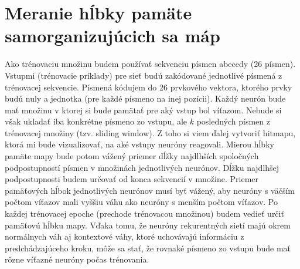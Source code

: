\section{Meranie hĺbky pamäte samorganizujúcich sa máp}
Ako trénovaciu množinu budem používať sekvenciu písmen abecedy (26 písmen).
Vstupmi (trénovacie príklady) pre sieť budú zakódované jednotlivé písmená z trénovacej sekvencie.
Písmená kódujem do 26 prvkového vektora, ktorého prvky budú nuly a jednotka (pre každé písmeno na inej pozícii).
Každý neurón bude mať množinu v ktorej si bude pamätať pre aký vstup bol víťazom. Nebude si však ukladať iba konkrétne písmeno zo vstupu, ale $k$ posledných písmen z trénovacej množiny (tzv. sliding window). 
Z toho si viem ďalej vytvoriť hitmapu, ktorá mi bude vizualizovať, na aké vstupy neuróny reagovali.
Mierou hĺbky pamäte mapy bude potom vážený priemer dĺžky najdlhších spoločných podpostupností písmen v množinách jednotlivých neurónov. Dĺžku najdlhšej podpostupnosti budem určovať od konca sekvencií v množine. Priemer pamäťových hĺbok jednotlivých neurónov musí byť vážený, aby neuróny s väčším počtom víťazov mali vyššiu váhu ako neuróny s menším počtom víťazov.
Po každej trénovacej epoche (prechode trénovacou množinou) budem vedieť určiť pamäťovú hĺbku mapy.
Vďaka tomu, že neuróny rekurentných sietí majú okrem normálnych váh aj kontextové váhy, ktoré uchovávajú informáciu z predchádzajúceho kroku,  môže sa stať, že rovnaké písmeno zo vstupu bude mať rôzne víťazné neuróny počas trénovania.










